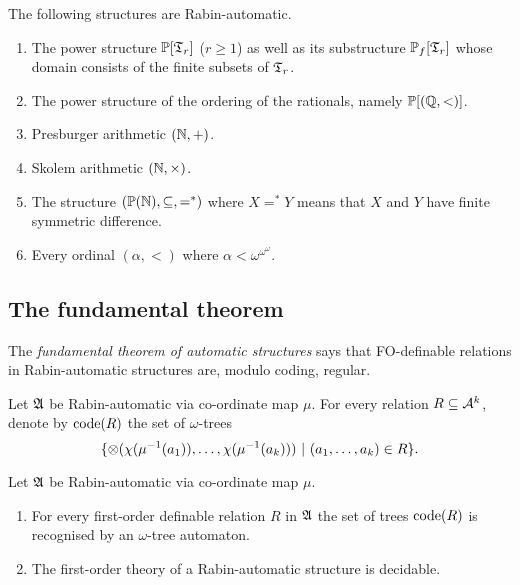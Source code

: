 \begin{example}
 The following structures are Rabin-automatic. 
\begin{enumerate}
 \item The power structure ${\mathbb P}[\mathfrak{T}_r]$ ($r \geq 1$) as well as its substructure ${\mathbb P}_f[\mathfrak{T}_r]$ whose domain consists of the finite subsets of $\mathfrak{T}_r$.
 \item The power structure of the ordering of the rationals, namely ${\mathbb P}[(\mathbb{Q},<)]$.
 \item Presburger arithmetic $(\mathbb{N},+)$.
 \item Skolem arithmetic $(\mathbb{N},\times)$.
 \item The structure $({\mathbb P}(\mathbb{N}),\subseteq, =^*)$ where $X =^* Y$ means that $X$ and $Y$ have finite symmetric difference.
 \item Every ordinal $(\alpha,<)$ where $\alpha < \omega^{\omega^\omega}$.
\end{enumerate}
\end{example}


\subsection{The fundamental theorem}

The {\em fundamental theorem of automatic structures} says that FO-definable relations in Rabin-automatic structures are, modulo coding, regular. 

\begin{definition}
Let $\mathfrak{A}$ be Rabin-automatic via co-ordinate map $\mu$. For every relation $R \subseteq {\mathcal A}^k$, denote by
${\rm code}({R})$ the set of $\omega$-trees 
\[\{\otimes(\chi({\mu^{-1}(a_1))},\dots,\chi({\mu^{-1}(a_k)})) \ \vert \   (a_1,\dots,a_k) \in R\}.\]
\end{definition}


\begin{theorem} \label{AS:thm:fundthm} 
Let $\mathfrak{A}$ be Rabin-automatic via co-ordinate map $\mu$.
\begin{enumerate}
\item For every first-order definable relation $R$ in $\mathfrak{A}$ the set of trees ${\rm code}({R})$ is recognised by an $\omega$-tree automaton.
\item The first-order theory of a Rabin-automatic structure is decidable.
\end{enumerate}
\end{theorem}

